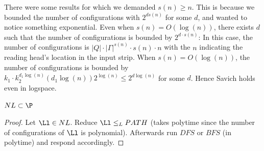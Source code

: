 \begin{remark}
	There were some results for which we demanded $s(n) \geq n$. This is because we bounded the number of configurations with $2^{ds(n)}$ for some $d$, and wanted to notice something exponential. Even when $s(n) = O(\log(n))$, there exists $d$ such that the number of configurations is bounded by $2^{d\cdot s(n)}$: In this case, the number of configurations is $|Q|\cdot |\Gamma|^{s(n)}\cdot s(n)\cdot n$ with the $n$ indicating the reading head's location in the input strip. When $s(n) = O(\log(n))$, the number of configurations is bounded by $k_1\cdot k_2^{d_1 \log(n)}(d_1\log(n))2^{\log(n)}\leq 2^{d\log(n)}$ for some $d$. Hence Savich holds even in logspace.
\end{remark}
\begin{blueBox}
	\begin{thm}
		$NL\subset \P$
	\end{thm}
\end{blueBox}
\begin{proof}
	Let $\Ll\in NL$. Reduce $\Ll\leq_L PATH$ (takes polytime since the number of configurations of $\Ll$ is polynomial). Afterwards run $DFS$ or $BFS$ (in polytime) and respond accordingly.
\end{proof}